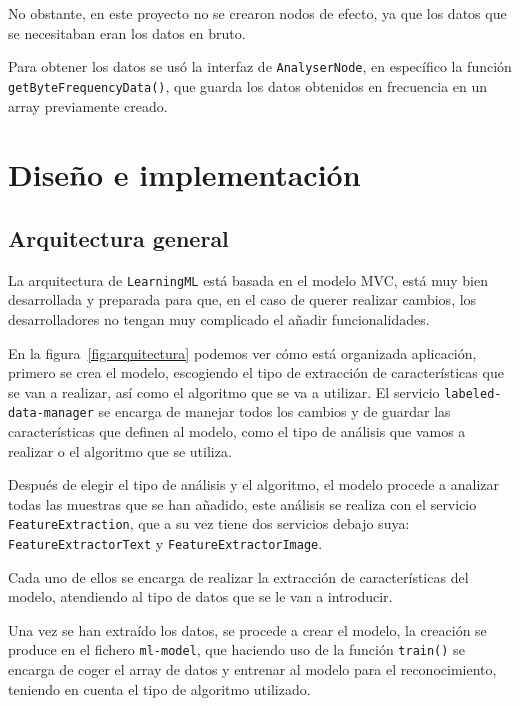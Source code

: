 \documentclass[a4paper, 12pt]{book}
\begin{document}
No obstante, en este proyecto no se crearon nodos de efecto, ya que los datos que se necesitaban eran los datos en bruto.

Para obtener los datos se usó la interfaz de \texttt{AnalyserNode}\cite{analyser-node}, en específico la función \texttt{getByteFrequencyData()}, que guarda los datos obtenidos en frecuencia en un array previamente creado.


\cleardoublepage
\chapter{Diseño e implementación}
\label{chap:diseño-implementacion}

\section{Arquitectura general} 
\label{sec:arquitectura}

La arquitectura de \texttt{LearningML} está basada en el modelo MVC\cite{mvc}, está muy bien desarrollada y preparada para que, en el caso de querer realizar cambios, los desarrolladores no tengan muy complicado el añadir funcionalidades.

En la figura~\ref{fig:arquitectura} podemos ver cómo está organizada aplicación, primero se crea el modelo, escogiendo el tipo de extracción de características que se van a realizar, así como el algoritmo que se va a utilizar. El servicio \texttt{labeled-data-manager} se encarga de manejar todos los cambios y de guardar las características que definen al modelo, como el tipo de análisis que vamos a realizar o el algoritmo que se utiliza.

Después de elegir el tipo de análisis y el algoritmo, el modelo procede a analizar todas las muestras que se han añadido, este análisis se realiza con el servicio \texttt{FeatureExtraction}, que a su vez tiene dos servicios debajo suya: \texttt{FeatureExtractorText} y \texttt{FeatureExtractorImage}.

Cada uno de ellos se encarga de realizar la extracción de características del modelo, atendiendo al tipo de datos que se le van a introducir.

Una vez se han extraído los datos, se procede a crear el modelo, la creación se produce en el fichero \texttt{ml-model}, que haciendo uso de la función \texttt{train()} se encarga de coger el array de datos y entrenar al modelo para el reconocimiento, teniendo en cuenta el tipo de algoritmo utilizado.
\end{document}
